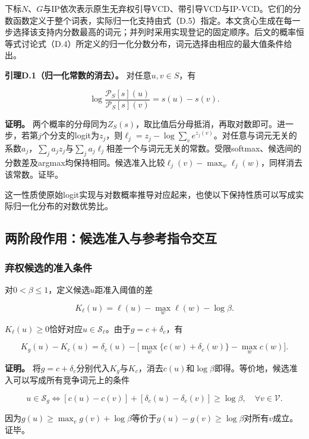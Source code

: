 下标\(N\)、\(G\)与\(\mathrm{IP}\)依次表示原生无弃权引导VCD、带引导VCD与IP-VCD。它们的分数函数定义于整个词表，实际归一化支持由式（D.5）指定。本文贪心生成在每一步选择该支持内分数最高的词元；并列时采用实现登记的固定顺序。后文的概率恒等式讨论式（D.4）所定义的归一化分数分布，词元选择由相应的最大值条件给出。

\textbf{引理D.1（归一化常数的消去）。} 对任意\(u,v\in S\)，有

\[
\log\frac{\mathcal P_S[s](u)}{\mathcal P_S[s](v)}=s(u)-s(v).
\tag{D.6}
\]

\textbf{证明。} 两个概率的分母同为\(Z_S(s)\)，取比值后分母抵消，再取对数即可。进一步，若第\(j\)个分支的logit为\(z_j\)，则\(\ell_j=z_j-\log\sum_v e^{z_j(v)}\)。对任意与词元无关的系数\(a_j\)，\(\sum_j a_jz_j\)与\(\sum_j a_j\ell_j\)相差一个与词元无关的常数。受限softmax、候选间的分数差及argmax均保持相同。候选准入比较\(\ell_j(v)-\max_w\ell_j(w)\)，同样消去该常数。证毕。

这一性质使原始logit实现与对数概率推导对应起来，也使以下保持性质可以写成实际归一化分布的对数优势比。

\subsection{两阶段作用：候选准入与参考指令交互}\label{ux4e24ux9636ux6bb5ux4f5cux7528ux5019ux9009ux51c6ux5165ux4e0eux53c2ux8003ux6307ux4ee4ux4ea4ux4e92}

\subsubsection{弃权候选的准入条件}\label{ux5f03ux6743ux5019ux9009ux7684ux51c6ux5165ux6761ux4ef6}

对\(0<\beta\leq1\)，定义候选\(u\)距准入阈值的差

\[
K_\ell(u)=\ell(u)-\max_w\ell(w)-\log\beta.
\tag{D.7}
\]

\(K_\ell(u)\geq0\)恰好对应\(u\in\mathcal S_\ell\)。由于\(g=c+\delta_c\)，有

\[
K_g(u)-K_c(u)
=\delta_c(u)-\big[\max_w\{c(w)+\delta_c(w)\}-\max_w c(w)\big].
\tag{D.8}
\]

\textbf{证明。} 将\(g=c+\delta_c\)分别代入\(K_g\)与\(K_c\)，消去\(c(u)\)和\(\log\beta\)即得。等价地，候选准入可以写成所有竞争词元上的条件

\[
u\in\mathcal S_g
\iff
[c(u)-c(v)]+[\delta_c(u)-\delta_c(v)]\geq\log\beta,
\quad\forall v\in\mathcal V.
\tag{D.9}
\]

因为\(g(u)\geq\max_vg(v)+\log\beta\)等价于\(g(u)-g(v)\geq\log\beta\)对所有\(v\)成立。证毕。

